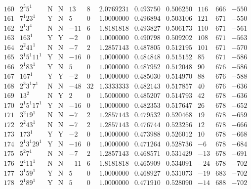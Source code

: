 \documentclass[11pt,reqno,a4letter]{article}
\numberwithin{figure}{section}
\numberwithin{table}{section}
\theoremstyle{plain}
\numberwithin{theorem}{section}
\theoremstyle{definition}
\begin{document}
\begin{table}[h!]
\begin{equation*}
{\begin{array}{cc|cc|ccc|cc|ccc}
 160 & 2^5 5^1 & \text{N} & \text{N} & 13 & 8 & 2.0769231 & 0.493750 & 0.506250 & 116 & 666 & -550 \\
 161 & 7^1 23^1 & \text{Y} & \text{N} & 5 & 0 & 1.0000000 & 0.496894 & 0.503106 & 121 & 671 & -550 \\
 162 & 2^1 3^4 & \text{N} & \text{N} & -11 & 6 & 1.8181818 & 0.493827 & 0.506173 & 110 & 671 & -561 \\
 163 & 163^1 & \text{Y} & \text{Y} & -2 & 0 & 1.0000000 & 0.490798 & 0.509202 & 108 & 671 & -563 \\
 164 & 2^2 41^1 & \text{N} & \text{N} & -7 & 2 & 1.2857143 & 0.487805 & 0.512195 & 101 & 671 & -570 \\
 165 & 3^1 5^1 11^1 & \text{Y} & \text{N} & -16 & 0 & 1.0000000 & 0.484848 & 0.515152 & 85 & 671 & -586 \\
 166 & 2^1 83^1 & \text{Y} & \text{N} & 5 & 0 & 1.0000000 & 0.487952 & 0.512048 & 90 & 676 & -586 \\
 167 & 167^1 & \text{Y} & \text{Y} & -2 & 0 & 1.0000000 & 0.485030 & 0.514970 & 88 & 676 & -588 \\
 168 & 2^3 3^1 7^1 & \text{N} & \text{N} & -48 & 32 & 1.3333333 & 0.482143 & 0.517857 & 40 & 676 & -636 \\
 169 & 13^2 & \text{N} & \text{Y} & 2 & 0 & 1.5000000 & 0.485207 & 0.514793 & 42 & 678 & -636 \\
 170 & 2^1 5^1 17^1 & \text{Y} & \text{N} & -16 & 0 & 1.0000000 & 0.482353 & 0.517647 & 26 & 678 & -652 \\
 171 & 3^2 19^1 & \text{N} & \text{N} & -7 & 2 & 1.2857143 & 0.479532 & 0.520468 & 19 & 678 & -659 \\
 172 & 2^2 43^1 & \text{N} & \text{N} & -7 & 2 & 1.2857143 & 0.476744 & 0.523256 & 12 & 678 & -666 \\
 173 & 173^1 & \text{Y} & \text{Y} & -2 & 0 & 1.0000000 & 0.473988 & 0.526012 & 10 & 678 & -668 \\
 174 & 2^1 3^1 29^1 & \text{Y} & \text{N} & -16 & 0 & 1.0000000 & 0.471264 & 0.528736 & -6 & 678 & -684 \\
 175 & 5^2 7^1 & \text{N} & \text{N} & -7 & 2 & 1.2857143 & 0.468571 & 0.531429 & -13 & 678 & -691 \\
 176 & 2^4 11^1 & \text{N} & \text{N} & -11 & 6 & 1.8181818 & 0.465909 & 0.534091 & -24 & 678 & -702 \\
 177 & 3^1 59^1 & \text{Y} & \text{N} & 5 & 0 & 1.0000000 & 0.468927 & 0.531073 & -19 & 683 & -702 \\
 178 & 2^1 89^1 & \text{Y} & \text{N} & 5 & 0 & 1.0000000 & 0.471910 & 0.528090 & -14 & 688 & -702 \\

\end{array}}
\end{equation*}
\end{table}
\end{document}
